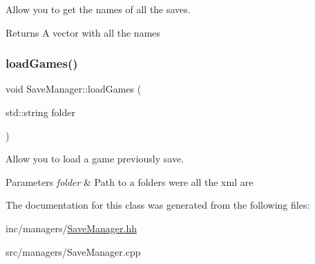 Allow you to get the names of all the saves. 

\begin{DoxyReturn}{Returns}
A vector with all the names 
\end{DoxyReturn}
\mbox{\label{classSaveManager_a96c17debbf9765e8c71e74010621585f}} 
\subsubsection{\texorpdfstring{load\+Games()}{loadGames()}}
{\footnotesize\ttfamily void Save\+Manager\+::load\+Games (\begin{DoxyParamCaption}\item[{std\+::string}]{folder }\end{DoxyParamCaption})}



Allow you to load a game previously save. 


\begin{DoxyParams}{Parameters}
{\em folder} & Path to a folders were all the xml are \\
\hline
\end{DoxyParams}


The documentation for this class was generated from the following files\+:\begin{DoxyCompactItemize}
\item 
inc/managers/\hyperlink{SaveManager_8hh}{Save\+Manager.\+hh}\item 
src/managers/Save\+Manager.\+cpp\end{DoxyCompactItemize}

